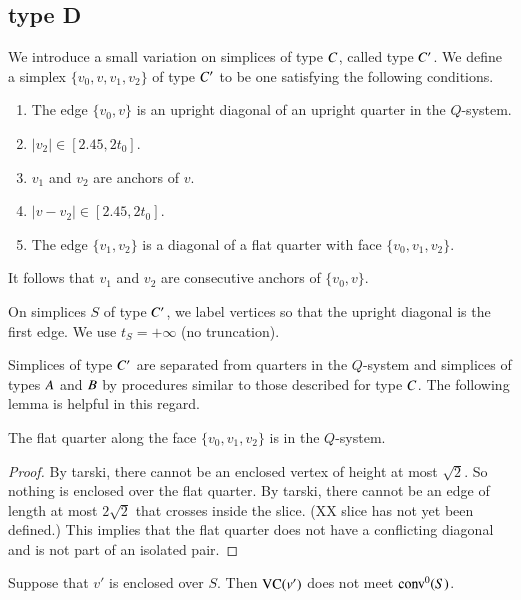 \subsection{type D}%

We introduce a small variation on simplices of type $C$, called
type $C' $.  We define a simplex $\{v_0,v,v_1,v_2\}$ of type $C' $
to be one satisfying the following conditions.
    \begin{enumerate}
    \item The edge $\{v_0,v\}$ is an upright diagonal of an upright quarter
        in the $Q$-system.
    \item $|v_2|\in[2.45,2t_0]$.
    \item $v_1$ and $v_2$ are anchors of $v$.
    \item $|v-v_2|\in [2.45,2t_0]$.
    \item The edge $\{v_1,v_2\}$
    is a diagonal of a flat quarter with face $\{v_0,v_1,v_2\}$.
    \end{enumerate}

It follows that $v_1$ and $v_2$ are consecutive anchors of
$\{v_0,v\}$.

On simplices $S$ of type $C' $, we label vertices so that the
upright diagonal is the first edge.  We use $t_S=+\infty$ (no
truncation).  

Simplices of type $C' $ are separated from quarters in the
$Q$-system and simplices of types $A$ and $B$ by procedures
similar to those described for type $C$.  The following lemma is
helpful in this regard.


\begin{lemma}\label{lemma:C'Q}
 The flat quarter along the face $\{v_0,v_1,v_2\}$ is
in the $Q$-system.
\end{lemma}

\begin{proof}
By tarski, there cannot be an enclosed vertex
of height at most $\sqrt2$. 
So nothing is enclosed over the flat quarter.
By tarski, there cannot be an edge of length
at most $2\sqrt2$ that crosses inside the slice.
(XX slice has not yet been defined.) 
This implies that the flat quarter does not have
a conflicting diagonal and is not part of an isolated pair.
\end{proof}


\begin{lemma}
Suppose that $v'$ is enclosed over $S$.  Then ${\operatorname{VC}}(v')$ does
not meet ${\operatorname{conv}}^0(S)$.
\end{lemma}

